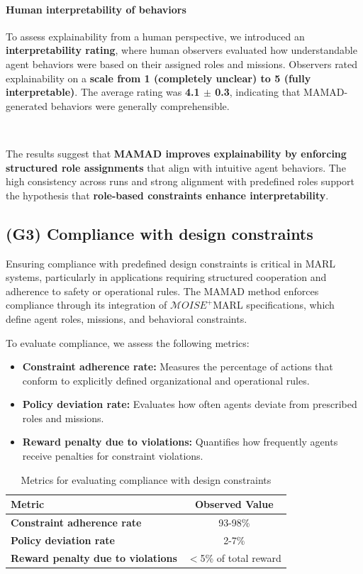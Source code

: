 \documentclass[pdflatex,sn-mathphys-num]{sn-jnl}%
\theoremstyle{thmstyleone}%
\theoremstyle{thmstyletwo}%
\theoremstyle{thmstylethree}%
\begin{document}
\paragraph{Human interpretability of behaviors}
To assess explainability from a human perspective, we introduced an \textbf{interpretability rating}, where human observers evaluated how understandable agent behaviors were based on their assigned roles and missions. Observers rated explainability on a \textbf{scale from 1 (completely unclear) to 5 (fully interpretable)}. The average rating was \textbf{4.1 $\pm$ 0.3}, indicating that MAMAD-generated behaviors were generally comprehensible.

\

The results suggest that \textbf{MAMAD improves explainability by enforcing structured role assignments} that align with intuitive agent behaviors. The high consistency across runs and strong alignment with predefined roles support the hypothesis that \textbf{role-based constraints enhance interpretability}.


\subsection{(G3) Compliance with design constraints}

Ensuring compliance with predefined design constraints is critical in MARL systems, particularly in applications requiring structured cooperation and adherence to safety or operational rules. The MAMAD method enforces compliance through its integration of $\mathcal{M}OISE^+$MARL specifications, which define agent roles, missions, and behavioral constraints. 

To evaluate compliance, we assess the following metrics:

\begin{itemize}
    \item \textbf{Constraint adherence rate:} Measures the percentage of actions that conform to explicitly defined organizational and operational rules.
    \item \textbf{Policy deviation rate:} Evaluates how often agents deviate from prescribed roles and missions.
    \item \textbf{Reward penalty due to violations:} Quantifies how frequently agents receive penalties for constraint violations.
\end{itemize}

\begin{table}[h!]
    \centering
    \caption{Metrics for evaluating compliance with design constraints}
    \begin{tabular}{|l|c|}
        \hline
        \textbf{Metric} & \textbf{Observed Value} \\
        \hline
        \textbf{Constraint adherence rate} & 93-98\% \\
        \hline
        \textbf{Policy deviation rate} & 2-7\% \\
        \hline
        \textbf{Reward penalty due to violations} & $<$5\% of total reward \\
        \hline
    \end{tabular}
    \label{tab:compliance}
\end{table}
\end{document}
